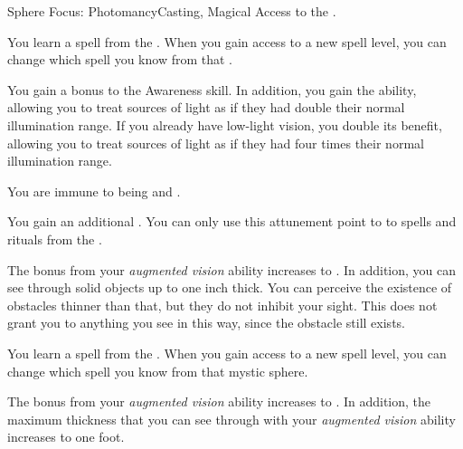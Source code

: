     \begin{feat}{Sphere Focus: Photomancy}{Casting, Magical}
        \featpre Access to the  .

         You learn a spell from the  .
        When you gain access to a new spell level, you can change which spell you know from that .

         You gain a  bonus to the Awareness skill.
        In addition, you gain the  ability, allowing you to treat sources of light as if they had double their normal illumination range.
        If you already have low-light vision, you double its benefit, allowing you to treat sources of light as if they had four times their normal illumination range.

         You are immune to being \dazzled and \blinded.

         You gain an additional .
        You can only use this attunement point to  to spells and rituals from the  .

         The bonus from your \textit{augmented vision} ability increases to .
        In addition, you can see through solid objects up to one inch thick.
        You can perceive the existence of obstacles thinner than that, but they do not inhibit your sight.
        This does not grant you  to anything you see in this way, since the obstacle still exists.

         You learn a spell from the  .
        When you gain access to a new spell level, you can change which spell you know from that mystic sphere.

         The bonus from your \textit{augmented vision} ability increases to .
        In addition, the maximum thickness that you can see through with your \textit{augmented vision} ability increases to one foot.
    \end{feat}


